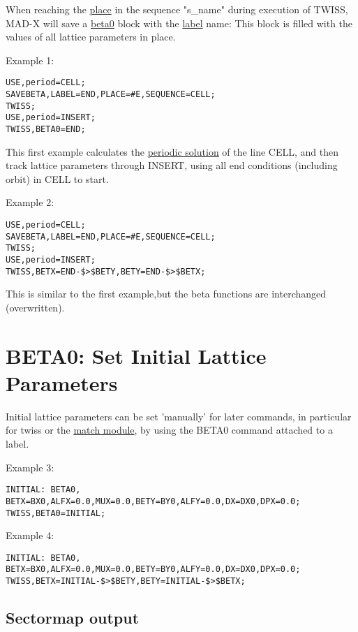 When reaching the \href{../control/general.html#place}{place} in the
sequence "s\_name" during execution of TWISS, MAD-X will save a
\hyperlink{beta0}{beta0} block with the
\href{../Introduction/label.html}{label} name: This block is filled with
the values of all lattice parameters in place.  

Example 1: 
\begin{verbatim}
USE,period=CELL;
SAVEBETA,LABEL=END,PLACE=#E,SEQUENCE=CELL;
TWISS;
USE,period=INSERT;
TWISS,BETA0=END;
\end{verbatim}

This first example calculates the \hyperlink{periodic}{periodic
  solution} of the line CELL, and then track lattice parameters through
INSERT, using all end conditions (including orbit) in CELL to start.  

Example 2: 
\begin{verbatim}
USE,period=CELL;
SAVEBETA,LABEL=END,PLACE=#E,SEQUENCE=CELL;
TWISS;
USE,period=INSERT;
TWISS,BETX=END-$>$BETY,BETY=END-$>$BETX;
\end{verbatim}

This is similar to the first example,but the beta functions are interchanged (overwritten).  

\section{BETA0: Set Initial Lattice Parameters}

Initial lattice parameters can be set 'manually' for later commands, in
particular for twiss or the \href{../match/match.html}{match module}, by
using the BETA0 command attached to a label.  

Example 3: 
\begin{verbatim}
INITIAL: BETA0, BETX=BX0,ALFX=0.0,MUX=0.0,BETY=BY0,ALFY=0.0,DX=DX0,DPX=0.0;
TWISS,BETA0=INITIAL;
\end{verbatim}

Example 4: 
\begin{verbatim}
INITIAL: BETA0, BETX=BX0,ALFX=0.0,MUX=0.0,BETY=BY0,ALFY=0.0,DX=DX0,DPX=0.0;
TWISS,BETX=INITIAL-$>$BETY,BETY=INITIAL-$>$BETX;
\end{verbatim}



%
\subsection{Sectormap output}
\label{subsec:sectormap}

